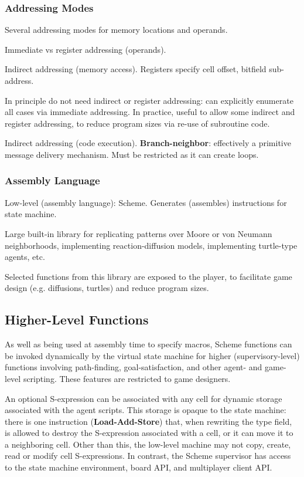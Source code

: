 \documentclass{acm_proc_article-sp}
\begin{document}
\subsubsection{Addressing Modes}

Several addressing modes for memory locations and operands.

Immediate vs register addressing (operands).

Indirect addressing (memory access). Registers specify cell offset, bitfield sub-address.

In principle do not need indirect or register addressing: can explicitly enumerate all cases via immediate addressing.
In practice, useful to allow some indirect and register addressing, to reduce program sizes via re-use of subroutine code.

Indirect addressing (code execution).
{\bf Branch-neighbor}: effectively a primitive message delivery mechanism.
Must be restricted as it can create loops.

\subsubsection{Assembly Language}

Low-level (assembly language):
Scheme. Generates (assembles) instructions for state machine.

Large built-in library for replicating patterns over Moore or von Neumann neighborhoods,
implementing reaction-diffusion models, implementing turtle-type agents, etc.

Selected functions from this library are exposed to the player,
to facilitate game design (e.g. diffusions, turtles) and reduce program sizes.

\subsection{Higher-Level Functions}

As well as being used at assembly time to specify macros,
Scheme functions can be invoked dynamically by the virtual state machine for higher (supervisory-level) functions involving path-finding, goal-satisfaction, and other agent- and game-level scripting.
These features are restricted to game designers.

An optional S-expression can be associated with any cell for dynamic storage associated with the agent scripts.
This storage is opaque to the state machine: there is one instruction ({\bf Load-Add-Store}) that, when rewriting the type field, is allowed to destroy the S-expression associated with a cell, or it can move it to a neighboring cell.
Other than this, the low-level machine may not copy, create, read or modify cell S-expressions.
In contrast, the Scheme supervisor has access to the state machine environment, board API, and multiplayer client API.
\end{document}
